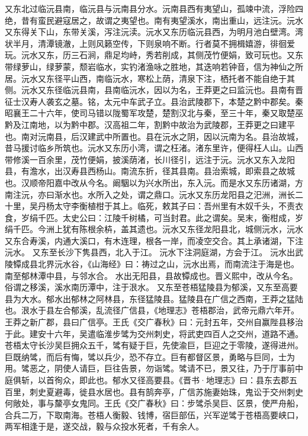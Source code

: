 \documentclass[12pt,UTF8]{ctexbook}
\begin{document}
又东北过临沅县南，临沅县与沅南县分水。沅南县西有夷望山，孤竦中流，浮险四绝，昔有蛮民避寇居之，故谓之夷望也。南有夷望溪水，南出重山，远注沅。沅水又东得关下山，东带关溪，泻注沅渎。沅水又东历临沅县西，为明月池白壁湾。湾状半月，清潭镜澈，上则风籁空传，下则泉响不断。行者莫不拥楫嬉游，徘徊爱玩。沅水又东，历三石涧，鼎足均峙，秀若削成，其侧茂竹便娟，致可玩也。又东带绿萝山，绿萝蒙，颓岩临水，实钓渚渔咏之胜地，其迭响若钟音，信为神仙之所居。沅水又东径平山西，南临沅水，寒松上荫，清泉下注，栖托者不能自绝于其侧。沅水又东径临沅县南，县南临沅水，因以为名，王莽更之曰监沅也。县南有晋征士汉寿人袭玄之墓。铭，太元中车武子立。县治武陵郡下，本楚之黔中郡矣。秦昭襄王二十六年，使司马错以陇蜀军攻楚，楚割汉北与秦，至三十年，秦又取楚巫黔及江南地，以为黔中郡。汉高祖二年，割黔中故治为武陵郡，王莽更之曰建平也。南对沅南县，后汉建武中所置也。县在沅水之阴，因以沅南为名。县治故城，昔马援讨临乡所筑也。沅水又东历小湾，谓之枉渚。渚东里许，便得枉人山。山西带修溪一百余里，茂竹便娟，披溪荫渚，长川径引，远注于沅。沅水又东入龙阳县，有澹水，出汉寿县西杨山。南流东折，径其县南。县治索城，即索县之故城也。汉顺帝阳嘉中改从今名。阚駰以为兴水所出，东入沅。而是水又东历诸湖，方南注沅，亦曰渐水也。水所入之处，谓之鼎口。沅水又东历龙阳县之汜洲，洲长二十里，吴丹杨太守李衡植柑于其上。临死，敕其子曰：吾州里有木奴千头，不责衣食，岁绢千匹。太史公曰：江陵千树橘，可当封君。此之谓矣。吴末，衡柑成，岁绢千匹。今洲上犹有陈根余枿，盖其遗也。沅水又东径龙阳县北，城侧沅水，沅水又东合寿溪，内通大溪口，有木连理，根各一岸，而凌空交合。其上承诸湖，下注沅水。
又东至长沙下隽县西，北入于江。
沅水下注洞庭湖，方会于江。
沅水出武陵镡成县北界沅水谷，《山海经》曰：祷过之山，沅水出焉，而南流注于海是也。南至郁林潭中县，与邻水合。
水出无阳县，县故镡成也。晋义熙中，改从今名。俗谓之移溪，溪水南历潭中，注于泿水。
又东至苍梧猛陵县为郁溪，又东至高要县为大水。郁水出郁林之阿林县，东径猛陵县。猛陵县在广信之西南，王莽之猛陆也。泿水于县左合郁溪，乱流径广信县，《地理志》苍梧郡治，武帝元鼎六年开。王莽之新广郡，县曰广信亭。王氏《交广春秋》曰：元封五年，交州自赢陛县移治于此。建安十六年，吴遣临淮步骘为交州刺史，将武吏四百人之交州，道路不通。苍梧太守长沙吴巨拥众五千，骘有疑于巨，先使渝巨，巨迎之于零陵，遂得进州。巨既纳骘，而后有悔，骘以兵少，恐不存立。巨有都督区景，勇略与巨同，士为用。骘恶之，阴使人请巨，巨往告景，勿诣骘。骘请不已，景又往，乃于厅事前中庭俱斩，以首徇众，即此也。郁水又径高要县。《晋书·地理志》曰：县东去郡五百里，刺史夏避毒，徙县水居也。县有鹄奔亭，广信苏施妻始珠，鬼讼于交州刺史何敞处，事与斄亭女鬼同。王氏《交广春秋》曰：步骘杀吴巨、区景，使严舟船，合兵二万，下取南海。苍梧人衡毅、钱博，宿巨部伍，兴军逆骘于苍梧高要峡口，两军相逢于是，遂交战，毅与众投水死者，千有余人。
\end{document}
